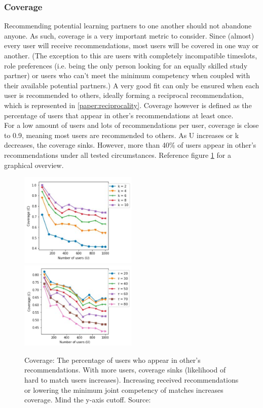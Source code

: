 \documentclass[conference]{IEEEtran}
\begin{document}
\subsubsection{Coverage} \label{paper:coverage}
Recommending potential learning partners to one another should not abandone anyone. As such, coverage is a very important metric to consider. Since (almost) every user will receive recommendations, most users will be covered in one way or another. (The exception to this are users with completely incompatible timeslots, role preferences (i.e. being the only person looking for an equally skilled study partner) or users who can't meet the minimum competency when coupled with their available potential partners.) A very good fit can only be ensured when each user is recommended to others, ideally forming a reciprocal recommendation, which is represented in \ref{paper:reciprocality}. Coverage however is defined as the percentage of users that appear in other's recommendations at least once.\\
For a low amount of users and lots of recommendations per user, coverage is close to 0.9, meaning most users are recommended to others. As U increases or k decreases, the coverage sinks. However, more than 40\% of users appear in other's recommendations under all tested circumstances. Reference figure \ref{f:coverage} for a graphical overview.\\

\begin{figure}[!t]
	\includegraphics[width=0.5\textwidth]{g/CoverageUk.PNG}
	\includegraphics[width=0.5\textwidth]{g/CoverageUT.PNG}
	\caption{Coverage: The percentage of users who appear in other's recommendations. With more users, coverage sinks (likelihood of hard to match users increases). Increasing received recommendations or lowering the minimum joint competency of matches increases coverage. Mind the y-axis cutoff. Source: \cite{potts2018reciprocal}}
	\label{f:coverage}
\end{figure}
\end{document}
